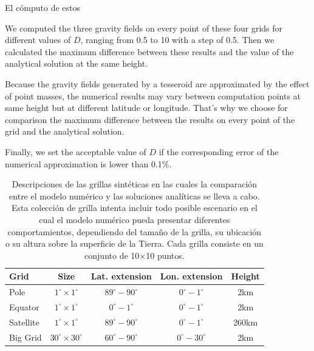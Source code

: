 \documentclass[a4paper,10pt]{article}
\begin{document}
El cómputo de estos 

We computed the three gravity fields  on every point of these four grids for different values of $D$, ranging from 0.5 to 10 with a step of 0.5.
Then we calculated the maximum difference between these results and the value of the analytical solution at the same height.

Because the gravity fields generated by a tesseroid are approximated by the effect of point masses, the numerical results may vary between computation points at same height but at different latitude or longitude.
That's why we choose for comparison the maximum difference between the results on every point of the grid and the analytical solution.

Finally, we set the acceptable value of $D$ if the corresponding error of the numerical approximation is lower than 0.1\%.

\begin{table}
\centering
\caption{
    Descripciones de las grillas sintéticas en las cuales la comparación entre el modelo numérico y las soluciones analíticas se lleva a cabo. Esta colección de grilla intenta incluir todo posible escenario en el cual el modelo numérico pueda presentar diferentes comportamientos, dependiendo del tamaño de la grilla, su ubicación o su altura sobre la superficie de la Tierra. Cada grilla consiste en un conjunto de 10$\times$10 puntos.
}
\label{tab:grids}
\begin{tabular}{lcccc}
    Grid & Size & Lat. extension & Lon. extension & Height \\ \hline
    Pole & $1^\circ \times 1^\circ$ & $89^\circ - 90^\circ$ & $0^\circ - 1^\circ$ & 2km \\
    Equator & $1^\circ \times 1^\circ$ & $0^\circ - 1^\circ$ & $0^\circ - 1^\circ$ & 2km \\
    Satellite & $1^\circ \times 1^\circ$ & $89^\circ - 90^\circ$ & $0^\circ - 1^\circ$ & 260km \\
    Big Grid & $30^\circ \times 30^\circ$ & $60^\circ - 90^\circ$ & $0^\circ - 30^\circ$ & 2km \\
\end{tabular}
\end{table}
\end{document}
